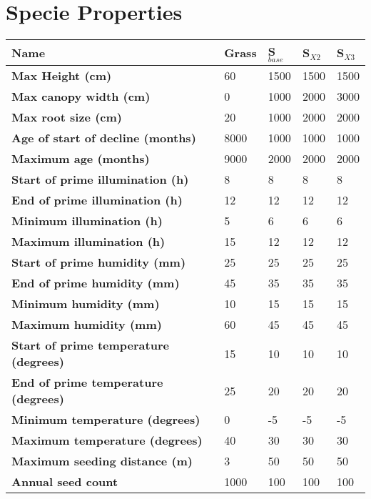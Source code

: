 \chapter{Specie Properties} \label{AppendixA}

\begin{table}[]
  \centering
	    \begin{tabular}{|p{5cm}|p{1cm}|p{1cm}|p{1cm}|p{1cm}|}
		\hline		
		\textbf{Name} & \textbf{Grass} & \textbf{S$_{base}$} & \textbf{S$_{X2}$} & \textbf{S$_{X3}$}\\
		\hline
		\textbf{Max Height (cm)} & 60 & 1500 & 1500 & 1500  \\
		\hline
		\textbf{Max canopy width (cm)} & 0 & 1000 & 2000 & 3000 \\
		\hline
		\textbf{Max root size (cm)} & 20 & 1000 & 2000 & 2000 \\
		\hline
		\textbf{Age of start of decline (months)} & 8000 & 1000 & 1000 & 1000 \\
		\hline
		\textbf{Maximum age (months)} & 9000 & 2000 & 2000 & 2000 \\
		\hline
		\textbf{Start of prime illumination (h)} & 8 & 8 & 8 & 8 \\
		\hline
		\textbf{End of prime illumination (h)} & 12 & 12 & 12 & 12 \\
		\hline
		\textbf{Minimum illumination (h)} & 5 & 6 & 6 & 6 \\
		\hline
		\textbf{Maximum illumination (h)} & 15 & 12 & 12 & 12 \\ 
		\hline
		\textbf{Start of prime humidity (mm)} & 25 & 25 & 25 & 25 \\
		\hline
		\textbf{End of prime humidity (mm)} & 45 & 35 & 35 & 35 \\
		\hline
		\textbf{Minimum humidity (mm)} & 10 & 15 & 15 & 15 \\
		\hline
		\textbf{Maximum humidity (mm)} & 60 & 45 & 45 & 45 \\
		\hline
		\textbf{Start of prime temperature (degrees)} & 15 & 10 & 10 & 10 \\
		\hline
		\textbf{End of prime temperature (degrees)} & 25 & 20 & 20 & 20 \\
		\hline
		\textbf{Minimum temperature (degrees)} & 0 & -5 & -5 & -5 \\
		\hline
		\textbf{Maximum temperature (degrees)} & 40 & 30 & 30 & 30 \\
		\hline
		\textbf{Maximum seeding distance (m)} & 3 & 50 & 50 & 50 \\
		\hline
		\textbf{Annual seed count} & 1000 & 100 & 100 & 100 \\
		\hline                                                                           
		\end{tabular}
\end{table}